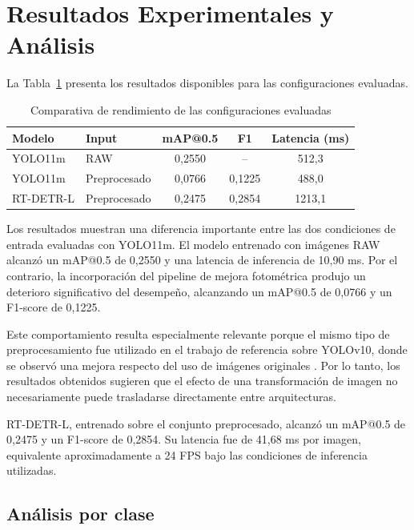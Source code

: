 \documentclass[conference]{IEEEtran}
\begin{document}
\section{Resultados Experimentales y Análisis}

La Tabla~\ref{tab:results} presenta los resultados disponibles para las configuraciones evaluadas.

\begin{table}[htbp]
\caption{Comparativa de rendimiento de las configuraciones evaluadas}
\label{tab:results}
\begin{center}
\begin{tabular}{llccc}
\toprule
\textbf{Modelo} & \textbf{Input} & \textbf{mAP@0.5} & \textbf{F1} & \textbf{Latencia (ms)} \\
\midrule
YOLO11m & RAW & 0,2550 & -- & 512,3 \\
YOLO11m & Preprocesado & 0,0766 & 0,1225 & 488,0 \\
RT-DETR-L & Preprocesado & 0,2475 & 0,2854 & 1213,1 \\
\bottomrule
\end{tabular}
\end{center}
\end{table}

Los resultados muestran una diferencia importante entre las dos condiciones de entrada evaluadas con YOLO11m. El modelo entrenado con imágenes RAW alcanzó un mAP@0.5 de 0,2550 y una latencia de inferencia de 10,90 ms. Por el contrario, la incorporación del pipeline de mejora fotométrica produjo un deterioro significativo del desempeño, alcanzando un mAP@0.5 de 0,0766 y un F1-score de 0,1225.

Este comportamiento resulta especialmente relevante porque el mismo tipo de preprocesamiento fue utilizado en el trabajo de referencia sobre YOLOv10, donde se observó una mejora respecto del uso de imágenes originales \cite{b3_srinivasu}. Por lo tanto, los resultados obtenidos sugieren que el efecto de una transformación de imagen no necesariamente puede trasladarse directamente entre arquitecturas.

RT-DETR-L, entrenado sobre el conjunto preprocesado, alcanzó un mAP@0.5 de 0,2475 y un F1-score de 0,2854. Su latencia fue de 41,68 ms por imagen, equivalente aproximadamente a 24 FPS bajo las condiciones de inferencia utilizadas.


\subsection{Análisis por clase}
\end{document}
